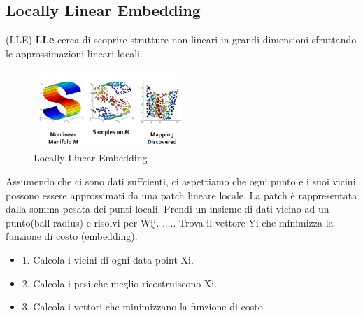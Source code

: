 \subsection{Locally Linear Embedding}(LLE)
\textbf{LLe} cerca di scoprire strutture non lineari in grandi dimensioni sfruttando le approssimazioni lineari locali.
\begin{figure}[H]
    \centering
    \includegraphics[width=0.5\textwidth]{images/LLe.png} 
    \caption{Locally Linear Embedding}
    \label{fig:immagine}
\end{figure}
Assumendo che ci sono dati suffcienti, ci aspettiamo che ogni punto e i suoi vicini possono essere approssimati da una patch lineare locale.
La patch è rappresentata dalla somma pesata dei punti locali.
Prendi un insieme di dati vicino ad un punto(ball-radius)
e risolvi per Wij.
.....
Trova il vettore Yi che minimizza la funzione di costo (embedding).
\begin{itemize}
    \item 1. Calcola i vicini di ogni data point Xi.
    \item 2. Calcola i pesi che meglio ricostruiscono Xi.
    \item 3. Calcola i vettori che minimizzano la funzione di costo.
\end{itemize}
